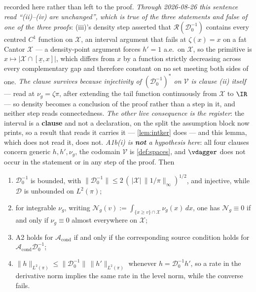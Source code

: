 \begin{lemma}
{recorded here rather than left to the proof}. \emph{Through 2026-08-26 this sentence read
``\textup{(ii)}--\textup{(iv)} are unchanged'', which is true of the three statements and false of one of
the three proofs}: \textup{(iii)}'s density step asserted that
$\mathcal R(\mathcal D^{-1}_0)$ contains every centred $C^{1}$ function on $\mathcal X$, an interval
argument that fails at $\zeta(x)=x$ on a fat Cantor $\mathcal X$ --- a density-point argument forces
$h'=1$ a.e.\ on $\mathcal X$, so the primitive is $x\mapsto|\mathcal X\cap[\underline x,x]|$, which
differs from $x$ by a function strictly decreasing across every complementary gap and therefore
constant on no set meeting both sides of one. \emph{The clause survives because injectivity of
$(\mathcal D^{-1}_0)^{\ast}$ on $\mathcal V$ is clause \textup{(ii)} itself} --- read at
$\nu_g=\zeta\pi$, after extending the tail function continuously from $\mathcal X$ to $\IR$ --- so
density becomes a conclusion of the proof rather than a step in it, and neither step reads
connectedness. \emph{The other live consequence is the
register}: the interval is a \textbf{clause} and not a declaration, on the split the assumption block now
prints, so a result that reads it carries it --- \cref{lem:intker} does --- and this lemma, which does
not read it, does not.
\emph{A1b(i) is \textbf{not} a hypothesis here}: all
four clauses concern generic $h,h',\nu_g$, the codomain $\mathcal V$ is \cref{def:spaces}, and
$\vdagger$ does not occur in the statement or in any step of the proof. Then
\begin{enumerate}
\item[(i)] $\mathcal D^{-1}_0$ is bounded, with
$\|\mathcal D^{-1}_0\|\le2\,(\,|\mathcal X|\,\|1/\pi\|_\infty)^{1/2}$, and injective, while
$\mathcal D$ is unbounded on $L^{2}(\pi)$;
\item[(ii)] for integrable $\nu_g$, writing $\mathcal N_g(v):=\int_{\{x\ge v\}\cap\mathcal X}\nu_g(x)\,dx$,
one has $\mathcal N_g\equiv0$ if and only if $\nu_g\equiv0$ almost everywhere on $\mathcal X$;
\item[(iii)] A2 holds for $\mathcal A_{\mathrm{cond}}$ if and only if the corresponding source condition
holds for $\mathcal A_{\mathrm{cond}}\mathcal D^{-1}_0$;
\item[(iv)] $\|h\|_{L^{2}(\pi)}\le\|\mathcal D^{-1}_0\|\,\|h'\|_{L^{2}(\pi)}$ whenever
$h=\mathcal D^{-1}_0h'$, so a rate in the derivative norm implies the same rate in the level norm, while
the converse fails.
\end{enumerate}
\end{lemma}

